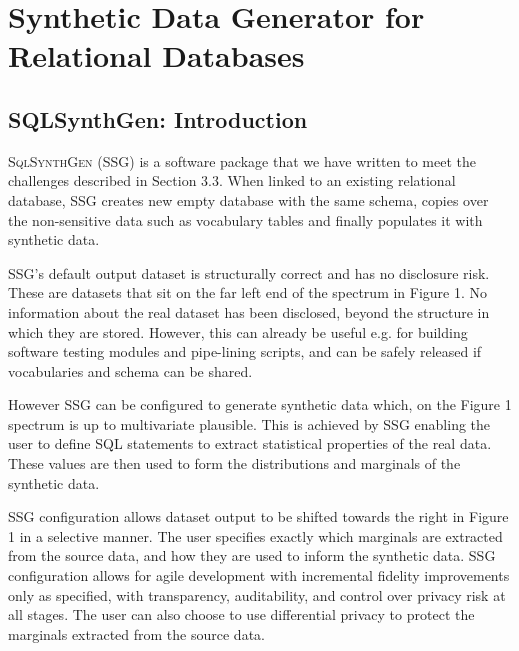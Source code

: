 \documentclass[11pt]{article}
\begin{document}
\section{Synthetic Data Generator for Relational Databases}

\subsection{SQLSynthGen: Introduction}

\textsc{SqlSynthGen} (SSG) is a software package that we have written to meet the challenges described in Section 3.3. When linked to an existing relational database, SSG creates new empty database with the same schema, copies over the non-sensitive data such as vocabulary tables and finally populates it with synthetic data. 

SSG's default output dataset is structurally correct and has no disclosure risk. These are datasets that sit on the far left end of the spectrum in Figure 1. No information about the real dataset has been disclosed, beyond the structure in which they are stored. However, this can already be useful e.g. for building software testing modules and pipe-lining scripts, and can be safely released if vocabularies and schema can be shared.

However SSG can be configured to generate synthetic data which, on the Figure 1 spectrum is up to multivariate plausible. This is achieved by SSG enabling the user to define SQL statements to extract statistical properties of the real data. These values are then used to form the distributions and marginals of the synthetic data. 

SSG configuration allows dataset output to be shifted towards the right in Figure 1 in a selective manner. The user specifies exactly which marginals are extracted from the source data, and how they are used to inform the synthetic data. SSG configuration allows for agile development with incremental fidelity improvements only as specified, with transparency, auditability, and control over privacy risk at all stages. The user can also choose to use differential privacy to protect the marginals extracted from the source data.
\end{document}
